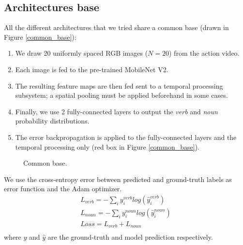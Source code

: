 \documentclass[12pt, a4paper]{report}
\begin{document}
			\subsection{Architectures base}
				All the different architectures that we tried share a common base (drawn in Figure \ref{common_base}):
				\begin{enumerate}
					\item We draw 20 uniformly spaced RGB images ($N=20$) from the action video.
					\item Each image is fed to the pre-trained MobileNet V2.
					\item The resulting feature maps are then fed sent to a temporal processing subsystem; a spatial pooling must be applied beforehand in some cases.
					\item Finally, we use 2 fully-connected layers to output the {\itshape verb} and {\itshape noun} probability distributions.
					\item The error backpropagation is applied to the fully-connected layers and the temporal processing only (red box in Figure \ref{common_base}).
				\end{enumerate}
				\begin{figure}[h!]
					\centering
					\caption{Common base.}
				\end{figure}
				We use the cross-entropy error between predicted and ground-truth labels as error function and the Adam optimizer.
				\begin{align*}
					L_{verb} = -\sum_{i} y^{verb}_{i}log(\hat{y}^{verb}_{i}) \\
					L_{noun} = -\sum_{i} y^{noun}_{i}log(\hat{y}^{noun}_{i}) \\
					Loss = L_{verb} + L_{noun} \\
				\end{align*}
				where $y$ and $\hat{y}$ are the ground-truth and model prediction respectively.
\end{document}
